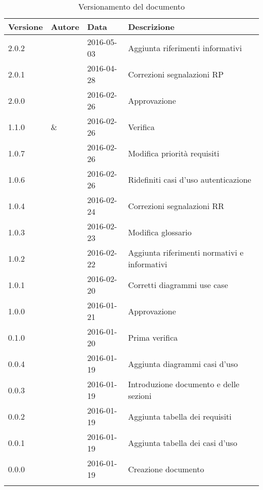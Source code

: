 \documentclass[12pt,a4paper]{article}
\begin{document}
\begin{center}
	\begin{longtable}[H]{p{} p{} p{} p{}}
		\toprule
		\textbf{Versione}	&	\textbf{Autore}	&	\textbf{Data}	&	\textbf{Descrizione}\\*
		\midrule
		\midrule
		2.0.2 & \TODO{} & 2016-05-03 & Aggiunta riferimenti informativi \\*
		\midrule
		2.0.1 & \TODO{} & 2016-04-28 & Correzioni segnalazioni RP \\*
		\midrule
		2.0.0 & \AB{} & 2016-02-26 & Approvazione \\*
		\midrule
		1.1.0 & \AVE{} \& \AVI{} & 2016-02-26 & Verifica \\*
		\midrule
		1.0.7 & \NDC{} & 2016-02-26 & Modifica priorità requisiti \\*
		\midrule
        1.0.6 & \TP{} & 2016-02-26 & Ridefiniti casi d'uso autenticazione \\*
		\midrule
		1.0.4 & \NDC{} & 2016-02-24 &  Correzioni segnalazioni RR \\*
		\midrule
		1.0.3 & \IB{} & 2016-02-23 &  Modifica glossario \\*
		\midrule
		1.0.2 & \IB{} & 2016-02-22 &  Aggiunta riferimenti normativi e informativi \\*
		\midrule
		1.0.1 & \NDC{} & 2016-02-20 &  Corretti diagrammi use case \\*
		\midrule
		1.0.0 & \NDC{} & 2016-01-21 &  Approvazione \\*
		\midrule
		0.1.0 & \AVI{} & 2016-01-20 &  Prima verifica \\*
		\midrule
		0.0.4 & \TP{} & 2016-01-19 & Aggiunta diagrammi casi d'uso\\*
		\midrule
		0.0.3 & \AVE{} & 2016-01-19 &  Introduzione documento e delle sezioni  \\*
		\midrule
		0.0.2 & \AB{} & 2016-01-19 &  Aggiunta tabella dei requisiti \\*
		\midrule
		0.0.1 & \WS{} & 2016-01-19 &  Aggiunta tabella dei casi d'uso \\*
		\midrule
		0.0.0 & \NDC{} & 2016-01-19 &  Creazione documento \\*
		\bottomrule
		\caption{Versionamento del documento}
		\label{tabVers1}
	\end{longtable}
\end{center}

\newpage
\tableofcontents
\newpage
\listoftables
\listoffigures
\newpage
\end{document}
